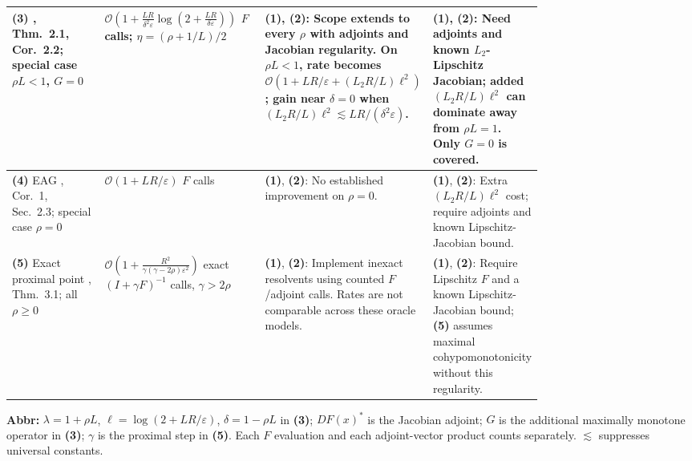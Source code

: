 \begin{table}[tp]
\begin{threeparttable}
\begin{tabularx}{\linewidth}{@{}>{\raggedright\arraybackslash}p{0.20\linewidth}>{\raggedright\arraybackslash}p{0.32\linewidth}>{\raggedright\arraybackslash}p{0.25\linewidth}>{\raggedright\arraybackslash}X@{}}
\midrule[1.2pt]
\textbf{(3)} \citep{akw2026v3adjoint}, Thm.~2.1, Cor.~2.2; special case $\rho L<1$, $G=0$ & $\displaystyle\mathcal{O}\!\left(1+\frac{LR}{\delta^2\varepsilon}\log\!\left(2+\frac{LR}{\delta\varepsilon}\right)\right)$ $F$ calls; $\eta=(\rho+1/L)/2$ & \textbf{(1)}, \textbf{(2)}: Scope extends to every $\rho$ with adjoints and Jacobian regularity. On $\rho L<1$, rate becomes $\mathcal{O}(1+LR/\varepsilon+(L_2R/L)\ell^2)$; gain near $\delta=0$ when $(L_2R/L)\ell^2\lesssim LR/(\delta^2\varepsilon)$. & \textbf{(1)}, \textbf{(2)}: Need adjoints and known $L_2$-Lipschitz Jacobian; added $(L_2R/L)\ell^2$ can dominate away from $\rho L=1$. Only $G=0$ is covered. \\
\midrule
\textbf{(4)} EAG \citep{yoon2021adjoint}, Cor.~1, Sec.~2.3; special case $\rho=0$ & $\mathcal{O}(1+LR/\varepsilon)$ $F$ calls & \textbf{(1)}, \textbf{(2)}: No established improvement on $\rho=0$. & \textbf{(1)}, \textbf{(2)}: Extra $(L_2R/L)\ell^2$ cost; require adjoints and known Lipschitz-Jacobian bound. \\
\midrule
\textbf{(5)} Exact proximal point \citep{gorbunov2023v3adjoint}, Thm.~3.1; all $\rho\geq0$ & $\displaystyle\mathcal{O}\!\left(1+\frac{R^2}{\gamma(\gamma-2\rho)\varepsilon^2}\right)$ exact $(I+\gamma F)^{-1}$ calls, $\gamma>2\rho$ & \textbf{(1)}, \textbf{(2)}: Implement inexact resolvents using counted $F$/adjoint calls. Rates are not comparable across these oracle models. & \textbf{(1)}, \textbf{(2)}: Require Lipschitz $F$ and a known Lipschitz-Jacobian bound; \textbf{(5)} assumes maximal cohypomonotonicity without this regularity. \\
\bottomrule
\end{tabularx}
\begin{tablenotes}[flushleft]\footnotesize
\item[] \textbf{Abbr:} $\lambda=1+\rho L$, $\ell=\log(2+LR/\varepsilon)$, $\delta=1-\rho L$ in \textbf{(3)}; $DF(x)^*$ is the Jacobian adjoint; $G$ is the additional maximally monotone operator in \textbf{(3)}; $\gamma$ is the proximal step in \textbf{(5)}. Each $F$ evaluation and each adjoint-vector product counts separately. $\lesssim$ suppresses universal constants.
\end{tablenotes}
\end{threeparttable}
\end{table}
\clearpage
